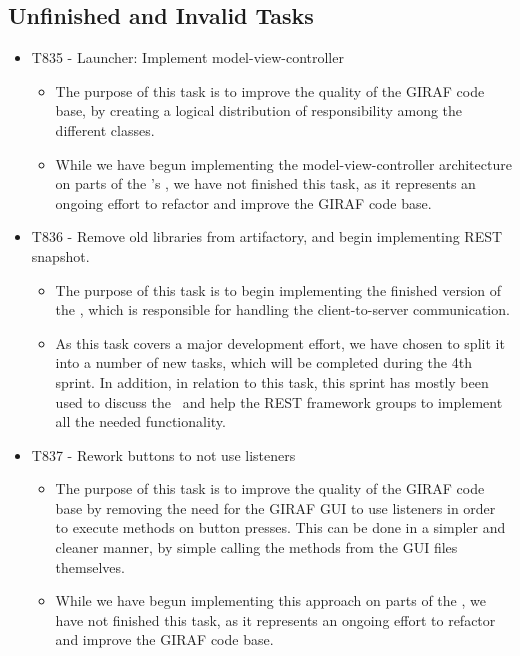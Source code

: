 \subsection{Unfinished and Invalid Tasks}\label{S3Invalid}
\begin{itemize}
  \item T835 - Launcher: Implement model-view-controller
  \begin{itemize}
      \item The purpose of this task is to improve the quality of the GIRAF code
      base, by creating a logical distribution of responsibility among the different
      classes.
      \item While we have begun implementing the model-view-controller architecture
      on parts of the \lapp's , we have not finished this task,
      as it represents an ongoing effort to refactor and improve the GIRAF code base.
  \end{itemize}
  \item T836 - Remove old libraries from artifactory, and begin implementing REST
snapshot.
  \begin{itemize}
      \item The purpose of this task is to begin implementing the finished version
      of the \rlib, which is responsible for handling the
      client-to-server communication.
      \item As this task covers a major development effort, we have chosen to split
      it into a number of new tasks, which will be completed during the 4th sprint.
      In addition, in relation to this task, this sprint has mostly been used to
      discuss the \rlib\ and help the REST framework groups to implement all the
      needed functionality.  
      \end{itemize}
  \item T837 - Rework buttons to not use listeners
  \begin{itemize}
    \item The purpose of this task is to improve the quality of the GIRAF code
    base by removing the need for the GIRAF GUI to use listeners in order to
    execute methods on button presses. This can be done in a simpler and cleaner
    manner, by simple calling the methods from the GUI  files
    themselves.
    \item While we have begun implementing this approach on parts of the \lapp,
    we have not finished this task, as it represents an ongoing effort to refactor and improve the GIRAF code base.
  \end{itemize}
\end{itemize}

